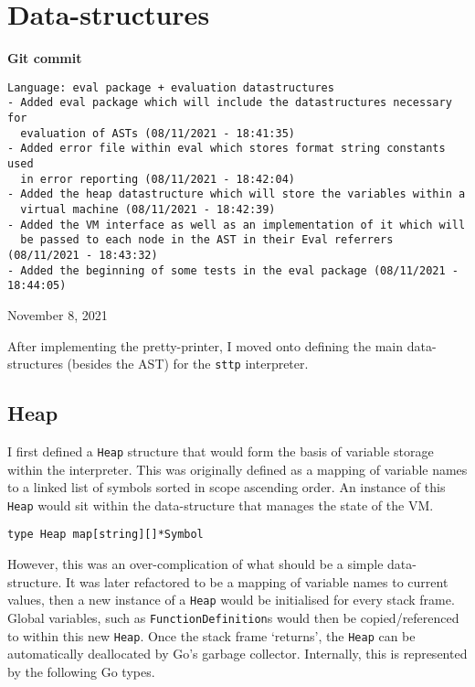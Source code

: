 \section{Data-structures}

\begin{center}
    \textbf{Git commit}
    \begin{verbatim}
Language: eval package + evaluation datastructures
- Added eval package which will include the datastructures necessary for
  evaluation of ASTs (08/11/2021 - 18:41:35)
- Added error file within eval which stores format string constants used
  in error reporting (08/11/2021 - 18:42:04)
- Added the heap datastructure which will store the variables within a
  virtual machine (08/11/2021 - 18:42:39)
- Added the VM interface as well as an implementation of it which will
  be passed to each node in the AST in their Eval referrers (08/11/2021 - 18:43:32)
- Added the beginning of some tests in the eval package (08/11/2021 - 18:44:05)
    \end{verbatim}
    \vspace{-1em}
    \tiny{November 8, 2021}
\end{center}

After implementing the pretty-printer, I moved onto defining the main data-structures (besides the AST) for the \verb|sttp| interpreter.

\subsection{Heap}
\label{sec:data-structures-heap}

I first defined a \verb|Heap| structure that would form the basis of variable storage within the interpreter. This was originally defined as a mapping of variable names to a linked list of symbols sorted in scope ascending order. An instance of this \verb|Heap| would sit within the data-structure that manages the state of the VM.

\begin{verbatim}
type Heap map[string][]*Symbol
\end{verbatim}

However, this was an over-complication of what should be a simple data-structure. It was later refactored to be a mapping of variable names to current values, then a new instance of a \verb|Heap| would be initialised for every stack frame. Global variables, such as \verb|FunctionDefinition|s would then be copied/referenced to within this new \verb|Heap|. Once the stack frame `returns', the \verb|Heap| can be automatically deallocated by Go's garbage collector. Internally, this is represented by the following Go types.

